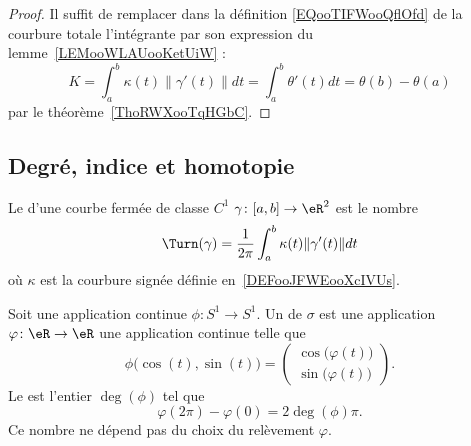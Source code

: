 \begin{proof}
	Il suffit de remplacer dans la définition \eqref{EQooTIFWooQflOfd} de la courbure totale l'intégrante par son expression du lemme~\ref{LEMooWLAUooKetUiW} :
	\begin{equation}
		K=\int_a^b\kappa(t)\| \gamma'(t) \|dt=\int_a^b\theta'(t)dt=\theta(b)-\theta(a)
	\end{equation}
	par le théorème~\ref{ThoRWXooTqHGbC}.
\end{proof}

\subsection{Degré, indice et homotopie}

\begin{definition}
	Le  d'une courbe fermée de classe \( C^1\) \( \gamma\colon \mathopen[ a , b \mathclose]\to \eR^2\) est le nombre
	\begin{equation}
		\Turn(\gamma)=\frac{1}{ 2\pi }\int_a^b\kappa(t)\| \gamma'(t) \|dt
	\end{equation}
	où \( \kappa\) est la courbure signée définie en~\ref{DEFooJFWEooXcIVUs}.
\end{definition}

\begin{lemmaDef}        \label{DEFooTKBUooNVcheO}
	Soit une application continue \( \phi\colon S^1\to S^1\). Un  de \( \sigma\) est une application \( \varphi\colon \eR\to \eR\) une application continue telle que
	\begin{equation}
		\phi\big( \cos(t),\sin(t) \big)=\begin{pmatrix}
			\cos\big( \varphi(t) \big) \\
			\sin\big( \varphi(t) \big)
		\end{pmatrix}.
	\end{equation}
	Le  est l'entier \( \deg(\phi)\) tel que
	\begin{equation}
		\varphi(2\pi)-\varphi(0)=2\deg(\phi)\pi.
	\end{equation}
	Ce nombre ne dépend pas du choix du relèvement \( \varphi\).
\end{lemmaDef}

